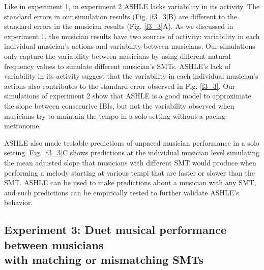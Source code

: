 \documentclass{report}
\begin{document}
Like in experiment 1, in experiment 2 ASHLE lacks variability in its activity. The standard errors in our simulation results (Fig.{} \ref{f3_3}B) are different to the standard errors in the musician results (Fig.{} \ref{f3_3}A). As we discussed in experiment 1, the musician results have two sources of activity: variability in each individual musician's actions and variability between musicians. Our simulations only capture the variability between musicians by using different natural frequency values to simulate different musician's SMTs. ASHLE's lack of variability in its activity suggest that the variability in each individual musician's actions also contributes to the standard error observed in Fig.{} \ref{f3_3}. Our simulations of experiment 2 show that ASHLE is a good model to approximate the slope between consecurive IBIs, but not the variability observed when musicians try to maintain the tempo in a solo setting without a pacing metronome.

ASHLE also made testable predictions of unpaced musician performance in a solo setting. Fig.{} \ref{f3_3}C shows predictions at the individual musician level simulating the mean adjusted slope that musicians with different SMT would produce when performing a melody starting at various tempi that are faster or slower than the SMT. ASHLE can be used to make predictions about a musician with any SMT, and such predictions can be empirically tested to further validate ASHLE's behavior.

\subsection{Experiment 3: Duet musical performance between musicians \\ with matching or mismatching SMTs}
\end{document}
